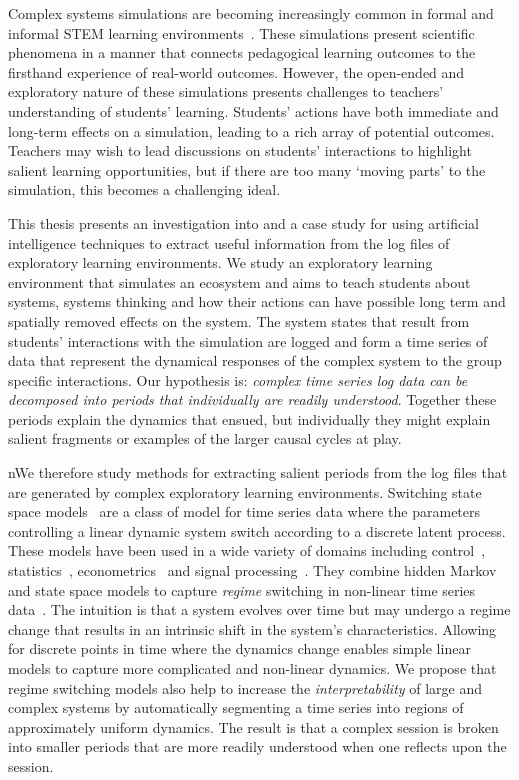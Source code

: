 Complex systems simulations are becoming increasingly common in formal and informal STEM learning environments~\citep{smordal2012hybrid}. These simulations present scientific phenomena in a manner that connects pedagogical learning outcomes to the firsthand experience of real-world outcomes. However, the open-ended and exploratory nature of these simulations presents challenges to teachers' understanding of students' learning. Students' actions have both immediate and long-term effects on a simulation, leading to a rich array of potential outcomes. Teachers may wish to lead discussions on students' interactions to highlight salient learning opportunities, but if there are too many `moving parts' to the simulation, this becomes a challenging ideal.

This thesis presents an investigation into and a case study for using artificial intelligence techniques to extract useful information from the log files of exploratory learning environments. We study an exploratory learning environment that simulates an ecosystem and aims to teach students about systems, systems thinking and how their actions can have possible long term and spatially removed effects on the system. The system states that result from students' interactions with the simulation are logged and form a time series of data that represent the dynamical responses of the complex system to the group specific interactions. Our hypothesis is: \textit{complex time series log data can be decomposed into periods that individually are readily understood}. Together these periods explain the dynamics that ensued, but individually they might explain salient fragments or examples of the larger causal cycles at play.

nWe therefore study methods for extracting salient periods from the log files that are generated by complex exploratory learning environments. Switching state space models~\citep{ghahramani2000variational} are a class of model for time series data where the parameters controlling a linear dynamic system switch according to a discrete latent process. These models have been used in a wide variety of domains including control~\citep{ikoma2002tracking}, statistics~\citep{cappe2009inference}, econometrics~\citep{giordani2007unified} and signal processing~\citep{kim1999state}. They combine hidden Markov and state space models to capture \textit{regime} switching in non-linear time series data~\citep{whiteley2010efficient}. The intuition is that a system evolves over time but may undergo a regime change that results in an intrinsic shift in the system's characteristics. Allowing for discrete points in time where the dynamics change enables simple linear models to capture more complicated and non-linear dynamics. We propose that regime switching models also help to increase the \textit{interpretability} of large and complex systems by automatically segmenting a time series into regions of approximately uniform dynamics. The result is that a complex session is broken into smaller periods that are more readily understood when one reflects upon the session.


